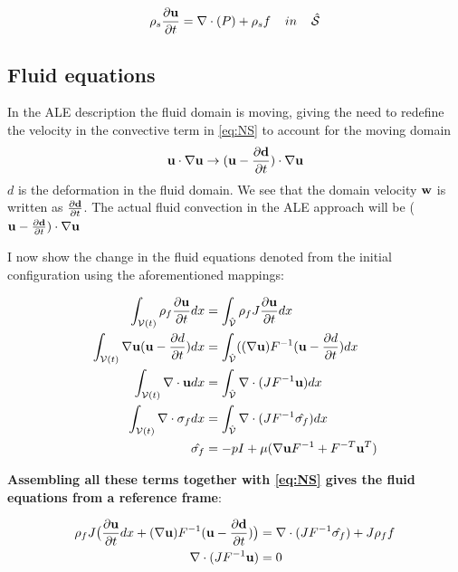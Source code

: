 \begin{equation}
\rho_s \frac{\partial \bold{u}}{\partial t} = \nabla \cdot (P) + \rho_s f \hspace{4mm}in\hspace{4mm} \hat{\mathcal{S}} 
\end{equation}

\subsection{Fluid equations}
In the ALE description the fluid domain is moving, giving the need to redefine the velocity in the convective term in \eqref{eq:NS} to account for the moving domain 
\begin{equation}
\bold{u} \cdot \nabla \bold{u} \rightarrow (\bold{u}-\frac{\partial \bold{d}}{\partial t}) \cdot \nabla \bold{u}  
\end{equation}
$d$ is the deformation in the fluid domain. We see that the domain velocity $\bold{w}$ is written as $\frac{\partial \bold{d}}{\partial t}$. The actual fluid convection in the ALE approach will be ($\bold{u}-\frac{\partial \bold{d}}{\partial t}) \cdot\nabla \bold{u}$ 

I now show the change in the fluid equations denoted from the initial configuration using the aforementioned mappings:

\begin{align}
\int_{\mathcal{V}(t)} \rho_f \frac{\partial \bold{u}}{\partial t} dx & = \int_{\hat{\mathcal{V}}}  \rho_f J \frac{\partial \bold{u}}{\partial t} dx \\
\int_{\mathcal{V}(t)} \nabla \bold{u} (\bold{u}-\frac{\partial d}{\partial t}) dx  &= \int_{\hat{\mathcal{V}}} ((\nabla \bold{u})F^{-1}(\bold{u}-\frac{\partial d}{\partial t}) dx  \\
\int_{\mathcal{V}(t)} \nabla \cdot \bold{u} dx  &=\int_{\hat{\mathcal{V}}}  \nabla \cdot (J F^{-1} \bold{u}  ) dx \\
\int_{\mathcal{V}(t)} \nabla \cdot \sigma_f dx &= \int_{\hat{\mathcal{V}}} \nabla \cdot( J F^{-1} \hat{\sigma_f} )     dx \\
\hat{\sigma_f} &= -pI + \mu ( \nabla \bold{u} F^{-1} + F^{-T} \bold{u}^{T}  ) 
\end{align}

\textbf{Assembling all these terms together with \eqref{eq:NS} gives the fluid equations from a reference frame}:

\begin{align}
\label{eq:NS_mapped}
\rho_f J \big( \frac{\partial \bold{u}}{\partial t} dx + (\nabla \bold{u})F^{-1}(\bold{u}-\frac{\partial \bold{d}}{\partial t}) \big) &= \nabla \cdot( J F^{-1} \hat{\sigma_f} ) + J \rho_f f \\
\nabla \cdot (J F^{-1} \bold{u} ) &= 0
\end{align} 


